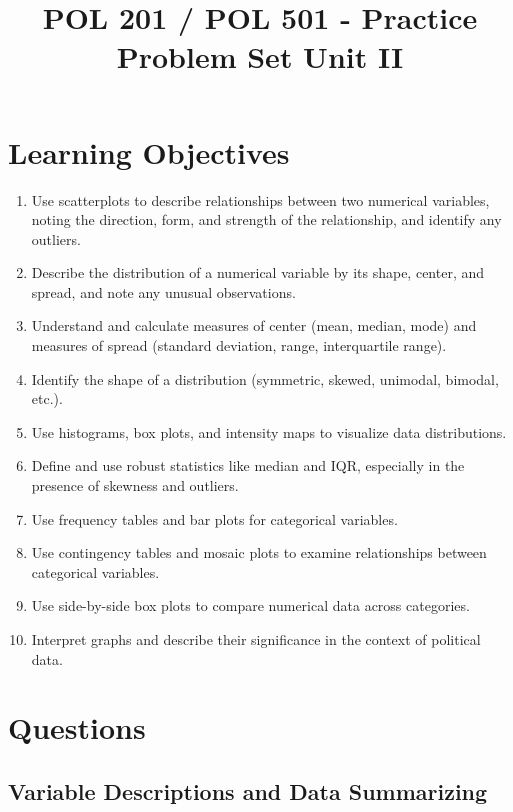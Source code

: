 \documentclass{article}
\title{POL 201 / POL 501 - Practice Problem Set Unit II}
\date{}
\author{}
\begin{document}
\maketitle

\section*{Learning Objectives}
\begin{enumerate}
    \item Use scatterplots to describe relationships between two numerical variables, noting the direction, form, and strength of the relationship, and identify any outliers.
    \item Describe the distribution of a numerical variable by its shape, center, and spread, and note any unusual observations.
    \item Understand and calculate measures of center (mean, median, mode) and measures of spread (standard deviation, range, interquartile range).
    \item Identify the shape of a distribution (symmetric, skewed, unimodal, bimodal, etc.).
    \item Use histograms, box plots, and intensity maps to visualize data distributions.
    \item Define and use robust statistics like median and IQR, especially in the presence of skewness and outliers.
    \item Use frequency tables and bar plots for categorical variables.
    \item Use contingency tables and mosaic plots to examine relationships between categorical variables.
    \item Use side-by-side box plots to compare numerical data across categories.
    \item Interpret graphs and describe their significance in the context of political data.
\end{enumerate}

\newpage

\section*{Questions}

\subsection*{Variable Descriptions and Data Summarizing}
\end{document}
